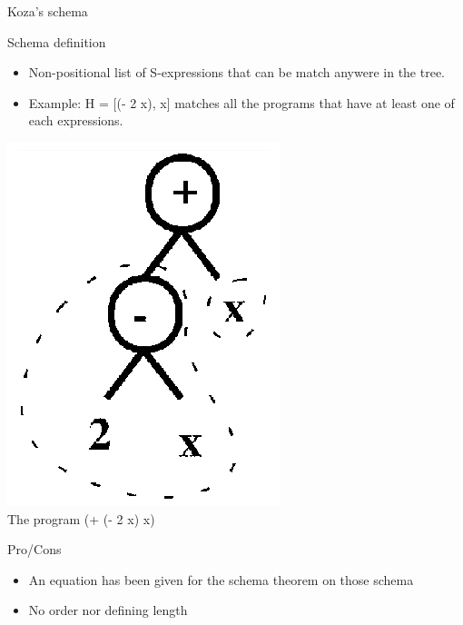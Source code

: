 \begin{frame}{Koza's schema}
  \begin{block}{Schema definition}
    \begin{itemize}
      \item Non-positional list of S-expressions that can be match anywere in the tree.\cite{Koza92}
      \item Example: H = [(- 2 x), x] matches all the programs that have at least one of each expressions.
    \end{itemize}
  \end{block}

  \begin{center}
    \includegraphics[scale=0.90]{img/schemak}\\
    The program (+ (- 2 x) x)
  \end{center}

  \begin{block}{Pro/Cons}
    \begin{itemize}
      \item<pro@1> An equation has been given for the schema theorem on those schema
      \item<con@1> No order nor defining length
    \end{itemize}
  \end{block}

\end{frame}

